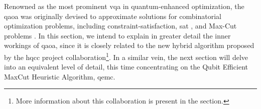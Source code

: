 






Renowned as the most prominent \acrshort{vqa} in quantum-enhanced optimization, the \acrshort{qaoa} \cite{farhi2014quantum} was originally devised to approximate solutions for combinatorial optimization problems, including constraint-satisfaction, \acrshort{sat} \cite{lin2016performance}, and Max-Cut problems \cite{PhysRevA.97.022304}. In this section, we intend to explain in greater detail the inner workings of \acrshort{qaoa}, since it is closely related to the new hybrid algorithm proposed by the \acrshort{hqcc} project collaboration\footnote{More information about this collaboration is present in the  section.}. In a similar vein, the next section will delve into an equivalent level of detail, this time concentrating on the Qubit Efficient MaxCut Heuristic Algorithm, \acrshort{qemc}.

